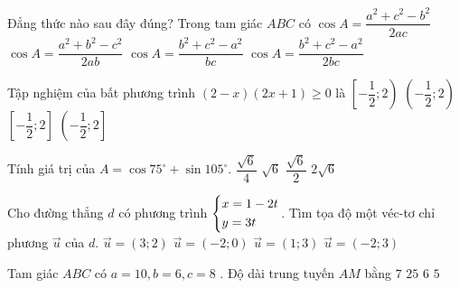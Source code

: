 \begin{ex}%
	Đẳng thức nào sau đây đúng? Trong tam giác $ABC$ có
	\choice
	{$\cos A=\dfrac{a^2+c^2-b^2}{2ac}$}
	{$\cos A=\dfrac{a^2+b^2-c^2}{2ab}$}
	{$\cos A=\dfrac{b^2+c^2-a^2}{bc}$}
	{\True $\cos A=\dfrac{b^2+c^2-a^2}{2bc}$}
\end{ex}
\begin{ex}%
	Tập nghiệm của bất phương trình $\left({2-x}\right)\left({2x+1}\right)\geqslant 0$ là
	\choice
	{$\left[{-\dfrac{1}{2};2}\right)$}
	{$\left({-\dfrac{1}{2};2}\right)$}
	{\True $\left[{-\dfrac{1}{2};2}\right]$}
	{$\left({-\dfrac{1}{2};2}\right]$}
\end{ex}
\begin{ex}%
	Tính giá trị của $A=\cos 75^\circ+\sin 105^\circ$.
	\choice
	{$\dfrac{\sqrt{6}}{4}$}
	{$\sqrt{6}$}
	{\True $\dfrac{\sqrt{6}}{2}$}
	{$2\sqrt{6}$}
\end{ex}
\begin{ex}%
	Cho đường thẳng $d$ có phương trình $\left\{\begin{aligned}& x=1-2t \\& y=3t\end{aligned}\right.$. 
	Tìm tọa độ một véc-tơ chỉ phương $\vec{u}$ của $d$.
	\choice
	{$\vec{u}=\left({3;2}\right)$}
	{$\vec{u}=\left({-2;0}\right)$}
	{$\vec{u}=\left({1;3}\right)$}
	{\True $\vec{u}=\left({-2;3}\right)$
	}
\end{ex}
\begin{ex}%
	Tam giác $ABC$ có $a=10, b=6, c=8$ . Độ dài trung tuyến $AM$ bằng
	\choice
	{$7$}
	{$25$}
	{$6$}
	{\True $5$}
\end{ex}
